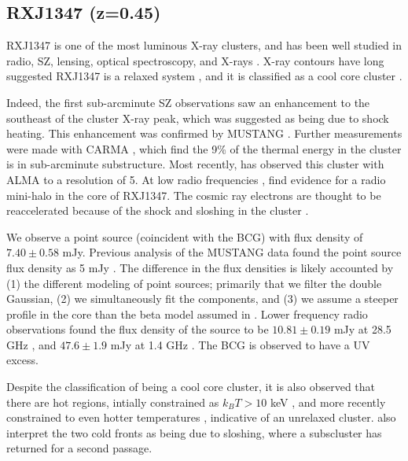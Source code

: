 \documentclass[iop,numberedappendix,apj]{emulateapj}
\begin{document}

\subsection{RXJ1347 (z=0.45)}
\label{sec:results_rxj1347}


RXJ1347 is one of the most luminous X-ray clusters, and has been well studied in radio, SZ, lensing, optical
spectroscopy, and X-rays \citep[e.g.][]{schindler1995,allen2002, pointecouteau1999,komatsu2001,kitayama2004,
gitti2007b,ota2008,bradac2008,miranda2008}. X-ray contours have long suggested RXJ1347 is a relaxed system
\citep[e.g.][]{schindler1997}, and it is classified as a cool core cluster \citep[e.g.][]{mann2012,sayers2013}. 

Indeed, the first sub-arcminute SZ observations \citep{komatsu2001,kitayama2004} saw an enhancement to
the southeast of the cluster X-ray peak, which was suggested as being due to shock heating. This enhancement
was confirmed by MUSTANG \citep{mason2010}. Further measurements were made with CARMA \citep{plagge2013},
which find the 9\% of the thermal energy in the cluster is in sub-arcminute substructure. Most recently,
\citet{kitayama2016} has observed this cluster with ALMA to a resolution of 5\asec.
At low radio frequencies \citep[][237 MHz and 614 MHz]{ferrari2011},
\citep[][1.4 GHz]{gitti2007a} find evidence for a radio mini-halo in the core of RXJ1347. The cosmic ray electrons
are thought to be reaccelerated because of the shock and sloshing in the cluster \citep{ferrari2011}.

We observe a point source (coincident with the BCG) with flux density of $7.40 \pm 0.58$ mJy. Previous analysis of 
the MUSTANG data found the point source flux density as 5 mJy \citep{mason2010}. The difference in the flux 
densities is likely accounted by (1) the different modeling of point sources; primarily that we filter the double 
Gaussian, (2) we simultaneously fit the components, and (3) we assume a steeper profile in the core than the beta 
model assumed in \citet{mason2010}. Lower frequency radio observations found the flux density of the source to be 
$10.81 \pm 0.19$ mJy at 28.5 GHz \citep{reese2002}, and $47.6 \pm 1.9$ mJy at 1.4 GHz \citep{condon1998}. The BCG 
is observed to have a UV excess\citep{donahue2015}. 

Despite the classification of being a cool core cluster, it is also observed that there are hot regions, intially
constrained as $k_BT > 10$ keV \citep[e.g.][]{allen2002,bradac2008}, and more recently constrained to even hotter 
temperatures \citep[$k_BT > 20$ keV][]{johnson2012}, indicative of an unrelaxed cluster. \citet{johnson2012} also 
interpret the two cold fronts as being due to sloshing, where a subscluster has returned for a second passage.
\end{document}

